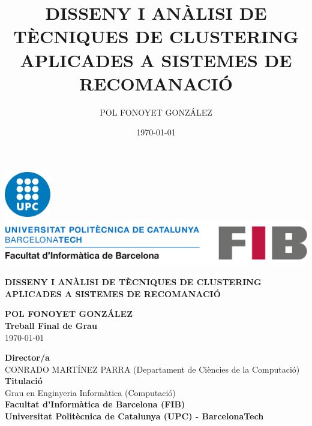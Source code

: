 \documentclass[a4paper,12pt]{report}
\title{DISSENY I ANÀLISI DE TÈCNIQUES DE
CLUSTERING APLICADES A SISTEMES DE
RECOMANACIÓ}
\author{POL FONOYET GONZÁLEZ}
\date{\today}
\begin{document}
\setcounter{secnumdepth}{4}  %

\setlength{\parskip}{10pt}

\begin{titlepage}
    
    \vspace*{-3cm}
    \hspace{-0.15\textwidth}
    \includegraphics[width=0.15\textwidth]{Figuras/logoUPC.png}
    \hspace{0.02\textwidth}
    \includegraphics[width=1\textwidth]{Figuras/logoFIB.png}\par

    \vspace{3cm}
    \centering
    \Large\textbf{DISSENY I ANÀLISI DE TÈCNIQUES DE CLUSTERING APLICADES A SISTEMES DE RECOMANACIÓ}

    \vspace{3cm}
    \centering
    \large\textbf{POL FONOYET GONZÁLEZ}\\
    \vspace{0.5cm}
    \textbf{Treball Final de Grau}\\
    \vspace{0.5cm}
    \Large \today

    \vspace{3cm}
    \centering
    \small
    \textbf{Director/a}\\
    CONRADO MARTÍNEZ PARRA (Departament de Ciències de la Computació)\\
    \vspace{0.5cm}
    \textbf{Titulació}\\
    Grau en Enginyeria Informàtica (Computació)\\
    \vspace{0.5cm}
    \vspace{0.5cm}
    \textbf{Facultat d'Informàtica de Barcelona (FIB)}\\
    \vspace{0.5cm}
    \textbf{Universitat Politècnica de Catalunya (UPC) - BarcelonaTech}\\


\end{titlepage}
\end{document}
